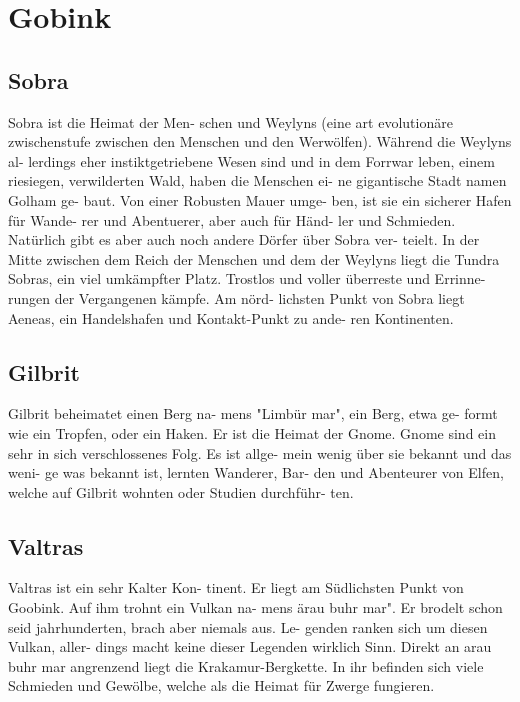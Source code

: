 \section{Gobink}

\subsection{Sobra}
Sobra ist die Heimat der Men-
schen und Weylyns (eine art evolutionäre
zwischenstufe zwischen den Menschen und
den Werwölfen). Während die Weylyns al-
lerdings eher instiktgetriebene Wesen sind
und in dem Forrwar leben, einem riesiegen,
verwilderten Wald, haben die Menschen ei-
ne gigantische Stadt namen Golham ge-
baut. Von einer Robusten Mauer umge-
ben, ist sie ein sicherer Hafen für Wande-
rer und Abentuerer, aber auch für Händ-
ler und Schmieden. Natürlich gibt es aber
auch noch andere Dörfer über Sobra ver-
teielt. In der Mitte zwischen dem Reich der
Menschen und dem der Weylyns liegt die
Tundra Sobras, ein viel umkämpfter Platz.
Trostlos und voller überreste und Errinne-
rungen der Vergangenen kämpfe. Am nörd-
lichsten Punkt von Sobra liegt Aeneas, ein
Handelshafen und Kontakt-Punkt zu ande-
ren Kontinenten.

\subsection{Gilbrit}
Gilbrit beheimatet einen Berg na-
mens "Limbür mar", ein Berg, etwa ge-
formt wie ein Tropfen, oder ein Haken. Er
ist die Heimat der Gnome. Gnome sind ein
sehr in sich verschlossenes Folg. Es ist allge-
mein wenig über sie bekannt und das weni-
ge was bekannt ist, lernten Wanderer, Bar-
den und Abenteurer von Elfen, welche auf
Gilbrit wohnten oder Studien durchführ-
ten.

\subsection{Valtras}
Valtras ist ein sehr Kalter Kon-
tinent. Er liegt am Südlichsten Punkt von
Goobink. Auf ihm trohnt ein Vulkan na-
mens ärau buhr mar". Er brodelt schon seid
jahrhunderten, brach aber niemals aus. Le-
genden ranken sich um diesen Vulkan, aller-
dings macht keine dieser Legenden wirklich
Sinn. Direkt an arau buhr mar angrenzend
liegt die Krakamur-Bergkette. In ihr befinden
sich viele Schmieden und Gewölbe, welche
als die Heimat für Zwerge fungieren.

